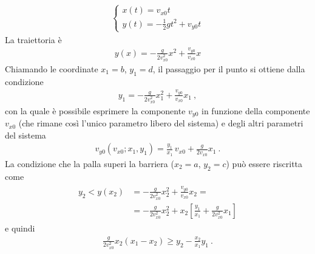 \documentclass[letterpaper,10pt,italian]{jupyterBook}
\begin{document}
\sphinxAtStartPar
{}
\begin{equation*}
\begin{split}\begin{cases}
  x(t) = v_{x0} t \\
  y(t) = -\frac{1}{2} g t^2 + v_{y0} t
\end{cases}\end{split}
\end{equation*}
\sphinxAtStartPar
La traiettoria è
\begin{equation*}
\begin{split}y(x) = - \frac{g}{2 v^2_{x0}} x^2 + \frac{v_{y0}}{v_{x0}} x \end{split}
\end{equation*}
\sphinxAtStartPar
Chiamando le coordinate \(x_1 = b\), \(y_1 = d\), il passaggio per il punto si ottiene dalla condizione
\begin{equation*}
\begin{split}y_1 = - \frac{g}{2 v^2_{x0}} x_1^2 + \frac{v_{y0}}{v_{x0}} x_1 \ ,\end{split}
\end{equation*}
\sphinxAtStartPar
con la quale è possibile esprimere la componente \(v_{y0}\) in funzione della componente \(v_{x0}\) (che rimane così l’unico parametro libero del sistema) e degli altri parametri del sistema
\begin{equation*}
\begin{split}v_{y0}(v_{x0}; x_1, y_1) = \frac{y_1}{x_1} \, v_{x0} + \frac{g}{2 v_{x0}} x_1 \ .\end{split}
\end{equation*}
\sphinxAtStartPar
La condizione che la palla superi la barriera (\(x_2 = a\), \(y_2 = c\)) può essere riscritta come
\begin{equation*}
\begin{split}\begin{aligned}
  y_2 < y(x_2)
  & = - \frac{g}{2 v^2_{x0}} x_2^2 + \frac{v_{y0}}{v_{x0}} x_2 = \\
  & = - \frac{g}{2 v^2_{x0}} x_2^2 + x_2  \left[ \frac{y_1}{x_1} + \frac{g}{2 v_{x0}^2} x_1 \right] 
\end{aligned}\end{split}
\end{equation*}
\sphinxAtStartPar
e quindi
\begin{equation*}
\begin{split}\frac{g}{2 v^2_{x0}} x_2 (x_1 - x_2) \ge y_2 - \frac{x_2}{x_1} y_1 \ .\end{split}
\end{equation*}
\end{document}
